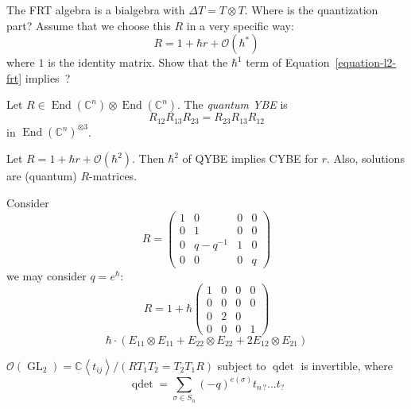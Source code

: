 \begin{exercise}
\label{exercise-l2-frt}
The FRT algebra is a bialgebra with
$\Delta T=T\otimes T$. Where is the
quantization part? Assume that we choose
this $R$ in a very specific way:
$$
R=1+\hbar r+\mathcal{O}(\hbar^{*})
$$
where $1$ is the identity matrix. Show
that the $\hbar^{1}$ term of
Equation~\ref{equation-l2-frt} implies\ ?
\end{exercise}

\begin{definition}
\label{definition-l2-qybe}
Let $R\in \operatorname{End}
(\mathbb{C}^{n})\otimes
\operatorname{End}(\mathbb{C}^{n})$. The
{\it quantum YBE} is
$$
R_{12}R_{13}R_{23}=R_{23}R_{13}R_{12}
$$
in $\operatorname{End}
(\mathbb{C}^{n})^{\otimes 3}$.
\end{definition}

\begin{exercise}
\label{exercise-l2-qybe}
Let $R=1+\hbar r+\mathcal{O}(\hbar^{2})$.
Then $\hbar^{2}$ of QYBE implies CYBE for
$r$. Also, solutions are (quantum)
$R$-matrices.
\end{exercise}

\begin{example}
\label{example-l2-r-matrix-q}
Consider
$$
R=\begin{pmatrix}
1&0&0&0\\0&1&0&0\\0&q-q^{-1}&1&0\\0&0&0&q
\end{pmatrix}
$$
we may consider $q=e^{\hbar}$:
$$
R=1+\hbar \begin{pmatrix}
1&0&0&0\\0&0&0&0\\0&2&0&\\0&0&0&1
\end{pmatrix}
$$
$$
\hbar \cdot (E_{11}\otimes E_{11}+
E_{22}\otimes E_{22}+
2E_{12}\otimes E_{21})
$$
\end{example}

\begin{definition}
\label{definition-l2-quantum-gl2}
$\mathcal{O}(\operatorname{GL}_{2})=
\mathbb{C}\left\langle{}t_{ij}
\right\rangle{} /
(RT_{1}T_{2}=T_{2}T_{1}R)$ subject to
$\operatorname{qdet}$ is invertible,
where
$$
\operatorname{qdet}=\sum_{\sigma\in S_{n}}
(-q)^{e(\sigma)}
t_{n\,?}\ldots t_{?}
$$
\end{definition}

